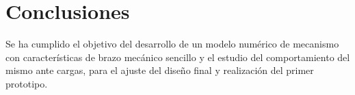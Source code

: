 \documentclass[11pt,a4paper,oldfontcommands,oneside]{memoir}
\begin{document}
\chapter{Conclusiones}
Se ha cumplido el objetivo del desarrollo de un modelo numérico de mecanismo con
características de brazo mecánico sencillo y el estudio del comportamiento del mismo ante
cargas, para el ajuste del diseño final y realización del primer prototipo.



\nocite{*}
\cite{de2017ingenieria}


\end{document}
